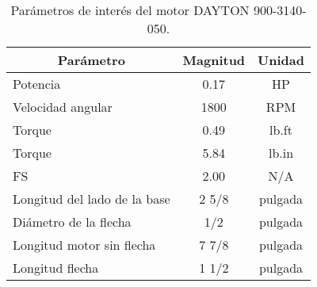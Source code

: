 \begin{table}[h]
\centering
\begin{tabular}{@{}lcc@{}}
\toprule
\multicolumn{1}{c}{\textbf{Parámetro}} & \textbf{Magnitud} & \textbf{Unidad} \\ \midrule
Potencia                               & 0.17              & HP              \\
Velocidad angular                      & 1800              & RPM             \\
Torque                                 & 0.49              & lb.ft           \\
Torque                                 & 5.84              & lb.in           \\
FS                                     & 2.00              & N/A             \\
Longitud del lado de la base           & 2 5/8             & pulgada         \\
Diámetro de la flecha                  & 1/2               & pulgada         \\
Longitud motor sin flecha              & 7 7/8             & pulgada         \\
Longitud flecha                        & 1 1/2             & pulgada         \\ \bottomrule
\end{tabular}
\caption{Parámetros de interés del motor DAYTON 900-3140-050.}
\label{tab:parametros_motor}
\end{table}
